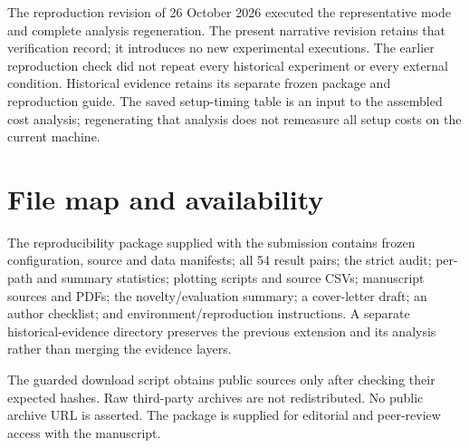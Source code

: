 \documentclass[smallextended]{svjour3}
\begin{document}
The reproduction revision of 26 October 2026 executed the representative mode and complete analysis regeneration.
The present narrative revision retains that verification record; it introduces
no new experimental executions. The earlier reproduction check did not repeat
every historical experiment or every external condition.
Historical evidence retains its separate frozen package and reproduction guide.
The saved setup-timing table is an input to the assembled cost analysis; regenerating
that analysis does not remeasure all setup costs on the current machine.

\section{File map and availability}
The reproducibility package supplied with the submission contains frozen configuration, source and data manifests;
all 54 result pairs; the strict audit; per-path and summary statistics; plotting
scripts and source CSVs; manuscript sources and PDFs; the novelty/evaluation
summary; a cover-letter draft; an author checklist; and environment/reproduction
instructions. A separate historical-evidence directory preserves the previous
extension and its analysis rather than merging the evidence layers.

The guarded download script obtains public sources only after checking their
expected hashes. Raw third-party archives are not redistributed. No public
archive URL is asserted. The package is supplied for editorial and peer-review
access with the manuscript.
\end{document}
